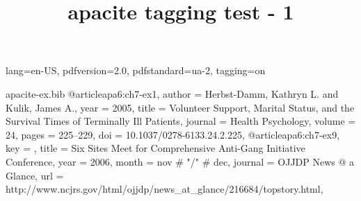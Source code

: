 \ifdefined\Uchar\RequirePackage{luatagging}\fi
\DocumentMetadata
  {
    lang=en-US,
    pdfversion=2.0,
    pdfstandard=ua-2,
    tagging=on
  }
\begin{filecontents}[noheader]{apacite-ex.bib}
@article{apa6:ch7-ex1,
  author  = {Herbst-Damm, Kathryn L. and Kulik, James A.},
  year    = {2005},
  title   = {Volunteer Support, Marital Status, and the Survival Times of
             Terminally Ill Patients},
  journal = {Health Psychology},
  volume  = {24},
  pages   = {225--229},
  doi     = {10.1037/0278-6133.24.2.225},
}
@article{apa6:ch7-ex9,
  key     = {{}},
  title   = {Six Sites Meet for Comprehensive Anti-Gang
             Initiative Conference},
  year    = {2006},
  month   = nov # "/" # dec,
  journal = {OJJDP News @ a Glance},
  url     =
    {http://www.ncjrs.gov/html/ojjdp/news_at_glance/216684/topstory.html},
}
\end{filecontents}

\documentclass{article}

\usepackage[mask]{apacite}
\usepackage{hyperref}

\title{apacite tagging test - 1}


\tableofcontents
\section{A section}

\cite<e.g.,>[p.~11]{apa6:ch7-ex1,apa6:ch7-ex9}

\citeA<e.g.,>[p.~11]{apa6:ch7-ex1,apa6:ch7-ex9}

\citeauthor<e.g.,>[p.~11]{apa6:ch7-ex1,apa6:ch7-ex9}

\citeyear<e.g.,>[p.~11]{apa6:ch7-ex1,apa6:ch7-ex9}

\citeyearNP<e.g.,>[p.~11]{apa6:ch7-ex1,apa6:ch7-ex9}

\citeNP<e.g.,>[p.~11]{apa6:ch7-ex1,apa6:ch7-ex9}

\fullcite<e.g.,>[p.~11]{apa6:ch7-ex1,apa6:ch7-ex9}

\shortcite<e.g.,>[p.~11]{apa6:ch7-ex1,apa6:ch7-ex9}

\maskcite<e.g.,>[p.~11]{apa6:ch7-ex1,apa6:ch7-ex9}




